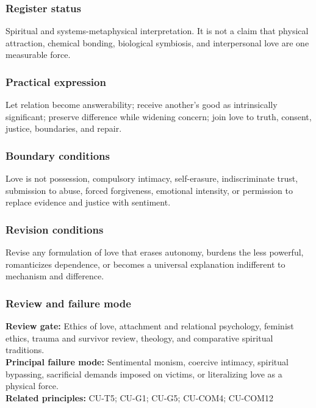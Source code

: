 \documentclass[
  11pt,
]{article}
\begin{document}
\subsubsection{Register status}\label{register-status-3}

Spiritual and systems-metaphysical interpretation. It is not a claim
that physical attraction, chemical bonding, biological symbiosis, and
interpersonal love are one measurable force.

\subsubsection{Practical expression}\label{practical-expression-3}

Let relation become answerability; receive another's good as
intrinsically significant; preserve difference while widening concern;
join love to truth, consent, justice, boundaries, and repair.

\subsubsection{Boundary conditions}\label{boundary-conditions-3}

Love is not possession, compulsory intimacy, self-erasure,
indiscriminate trust, submission to abuse, forced forgiveness, emotional
intensity, or permission to replace evidence and justice with sentiment.

\subsubsection{Revision conditions}\label{revision-conditions-3}

Revise any formulation of love that erases autonomy, burdens the less
powerful, romanticizes dependence, or becomes a universal explanation
indifferent to mechanism and difference.

\subsubsection{Review and failure mode}\label{review-and-failure-mode-3}

\textbf{Review gate:} Ethics of love, attachment and relational
psychology, feminist ethics, trauma and survivor review, theology, and
comparative spiritual traditions.\\
\textbf{Principal failure mode:} Sentimental monism, coercive intimacy,
spiritual bypassing, sacrificial demands imposed on victims, or
literalizing love as a physical force.\\
\textbf{Related principles:} CU-T5; CU-G1; CU-G5; CU-COM4; CU-COM12
\end{document}
